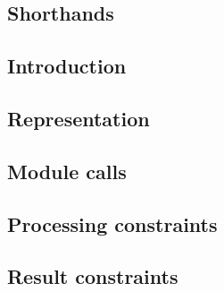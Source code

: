 \subsection{Shorthands}                      \label{block hash: processing: shorthands}               
\subsection{Introduction}                    \label{block hash: processing: introduction}             
\subsection{Representation}                  \label{block hash: processing: representation}           
\subsection{Module calls}                    \label{block hash: processing: module calls}             
\subsection{Processing constraints}          \label{block hash: processing: processing constraints}   
\subsection{Result constraints}              \label{block hash: processing: result constraints}       
